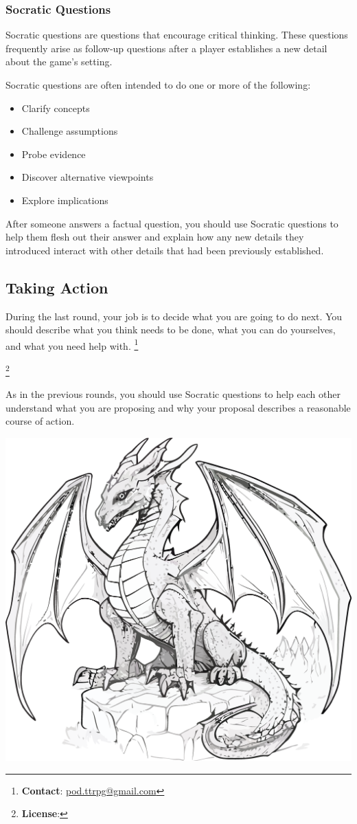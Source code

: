 \documentclass[a6paper, 11pt, parskip=half, DIV=15]{scrartcl}
\newcommand\blfootnote[1]{%
  \begingroup
  \renewcommand\thefootnote{}\footnote{#1}%
  \addtocounter{footnote}{-1}%
  \endgroup
}
\renewcommand{\thefootnote}{\fnsymbol{footnote}}
\begin{document}
\subsubsection*{Socratic Questions}
Socratic questions are questions that encourage critical thinking.
These questions frequently arise as follow-up questions after a player establishes a new detail about the game's setting.

Socratic questions are often intended to do one or more of the following:
\begin{itemize}[nosep]
	\item Clarify concepts
	\item Challenge assumptions
	\item Probe evidence
	\item Discover alternative viewpoints
	\item Explore implications
\end{itemize}

After someone answers a factual question, you should use Socratic questions to help them flesh out their answer and explain how any new details they introduced interact with other details that had been previously established.

\newpage
\enlargethispage{1.75\baselineskip}

\subsection*{Taking Action}
During the last round, your job is to decide what you are going to do next.
You should describe what you think needs to be done, what you can do yourselves, and what you need help with.
\blfootnote{\textbf{Contact}: \href{mailto:pod.ttrpg@gmail.com}{pod.ttrpg@gmail.com}}
\blfootnote{\textbf{License}: \raggedright\doclicenseLongText}

As in the previous rounds, you should use Socratic questions to help each other understand what you are proposing and why your proposal describes a reasonable course of action.

\vfill

\begin{center}
\includegraphics[scale=0.0625]{Images/dragon_on_rocks2.png}
\end{center}

\vfill
\end{document}
